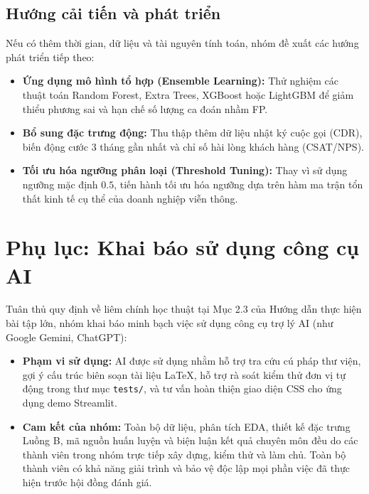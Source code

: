 \documentclass[12pt,a4paper]{article}
\begin{document}
\subsection{Hướng cải tiến và phát triển}
Nếu có thêm thời gian, dữ liệu và tài nguyên tính toán, nhóm đề xuất các hướng phát triển tiếp theo:
\begin{itemize}
    \item \textbf{Ứng dụng mô hình tổ hợp (Ensemble Learning):} Thử nghiệm các thuật toán Random Forest, Extra Trees, XGBoost hoặc LightGBM để giảm thiểu phương sai và hạn chế số lượng ca đoán nhầm FP.
    \item \textbf{Bổ sung đặc trưng động:} Thu thập thêm dữ liệu nhật ký cuộc gọi (CDR), biến động cước 3 tháng gần nhất và chỉ số hài lòng khách hàng (CSAT/NPS).
    \item \textbf{Tối ưu hóa ngưỡng phân loại (Threshold Tuning):} Thay vì sử dụng ngưỡng mặc định $0.5$, tiến hành tối ưu hóa ngưỡng dựa trên hàm ma trận tổn thất kinh tế cụ thể của doanh nghiệp viễn thông.
\end{itemize}

\section*{Phụ lục: Khai báo sử dụng công cụ AI}
Tuân thủ quy định về liêm chính học thuật tại Mục 2.3 của Hướng dẫn thực hiện bài tập lớn, nhóm khai báo minh bạch việc sử dụng công cụ trợ lý AI (như Google Gemini, ChatGPT):
\begin{itemize}
    \item \textbf{Phạm vi sử dụng:} AI được sử dụng nhằm hỗ trợ tra cứu cú pháp thư viện, gợi ý cấu trúc biên soạn tài liệu \LaTeX, hỗ trợ rà soát kiểm thử đơn vị tự động trong thư mục \texttt{tests/}, và tư vấn hoàn thiện giao diện CSS cho ứng dụng demo Streamlit.
    \item \textbf{Cam kết của nhóm:} Toàn bộ dữ liệu, phân tích EDA, thiết kế đặc trưng Luồng B, mã nguồn huấn luyện và biện luận kết quả chuyên môn đều do các thành viên trong nhóm trực tiếp xây dựng, kiểm thử và làm chủ. Toàn bộ thành viên có khả năng giải trình và bảo vệ độc lập mọi phần việc đã thực hiện trước hội đồng đánh giá.
\end{itemize}
\end{document}
